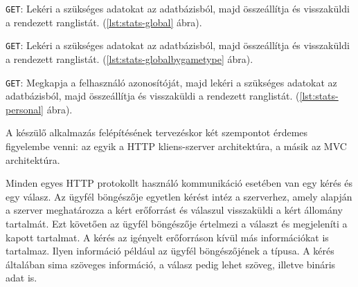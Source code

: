 

\texttt{GET}: Lekéri a szükséges adatokat az adatbázisból, majd összeállítja és visszaküldi a rendezett ranglistát. (\ref{lst:stats-global} ábra).



\texttt{GET}: Lekéri a szükséges adatokat az adatbázisból, majd összeállítja és visszaküldi a rendezett ranglistát. (\ref{lst:stats-globalbygametype} ábra).



\texttt{GET}: Megkapja a felhasználó azonosítóját, majd lekéri a szükséges adatokat az adatbázisból, majd összeállítja és visszaküldi a rendezett ranglistát. (\ref{lst:stats-personal} ábra).





A készülő alkalmazás felépítésének tervezéskor két szempontot érdemes figyelembe venni: az egyik a HTTP kliens-szerver architektúra, a másik az MVC architektúra.

Minden egyes HTTP protokollt használó kommunikáció esetében van egy kérés és egy válasz. Az ügyfél böngészője egyetlen kérést intéz a szerverhez, amely alapján a szerver meghatározza a kért erőforrást és válaszul visszaküldi a kért állomány tartalmát. Ezt követően az ügyfél böngészője értelmezi a választ és megjeleníti a kapott tartalmat. A kérés az igényelt erőforráson kívül más információkat is tartalmaz. Ilyen információ például az ügyfél böngészőjének a típusa. A kérés általában sima szöveges információ, a válasz pedig lehet szöveg, illetve bináris adat is. \cite{java-web-tech}

